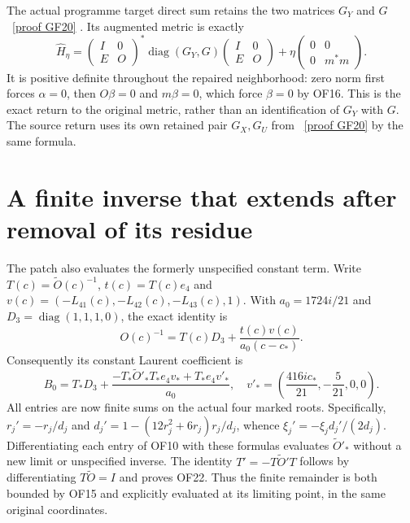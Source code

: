\documentclass[11pt]{article}
\newcommand{\diag}{\operatorname{diag}}
\begin{document}
The actual programme target direct sum retains the two matrices
$G_Y$ and $G$ \cite[RW14]{Fable}%
~\href{https://github.com/KokunoYumeto/zeta-function-research-reader/blob/5992ad50c0f2a06921f1fcaded7b4e38097c0739/workbenches/splitzero-tandem/continuations/20260920-original-kernel-mixed-determinants/providers/FABLE_TO_ORIGINAL_CONDUCTOR.tex\#L1598}{[proof GF20]}%
{}. Its augmented metric is exactly
\begin{equation}
 \widehat H_\eta=
 \begin{pmatrix}I&0\\E&O\end{pmatrix}^{\!*}
 \diag(G_Y,G)
 \begin{pmatrix}I&0\\E&O\end{pmatrix}
 +\eta\begin{pmatrix}0&0\\0&m^*m\end{pmatrix}.
 \tag{OF20}
\end{equation}
It is positive definite throughout the repaired neighborhood:
zero norm first forces $\alpha=0$, then $O\beta=0$ and
$m\beta=0$, which force $\beta=0$ by OF16. This is the exact
return to the original metric, rather than an identification of
$G_Y$ with $G$. The source return uses its own retained pair
$G_X,G_U$ from \cite[RW19]{Fable}%
~\href{https://github.com/KokunoYumeto/zeta-function-research-reader/blob/5992ad50c0f2a06921f1fcaded7b4e38097c0739/workbenches/splitzero-tandem/continuations/20260920-original-kernel-mixed-determinants/providers/FABLE_TO_ORIGINAL_CONDUCTOR.tex\#L1598}{[proof GF20]}%
{} by the same formula.

\section{A finite inverse that extends after removal of its residue}
The patch also evaluates the formerly unspecified constant term.
Write $T(c)=\widetilde O(c)^{-1}$, $t(c)=T(c)e_4$ and
$v(c)=(-L_{41}(c),-L_{42}(c),-L_{43}(c),1)$.
With $a_0=1724i/21$ and $D_3=\diag(1,1,1,0)$, the exact identity is
\begin{equation}
 O(c)^{-1}=T(c)D_3+\frac{t(c)v(c)}{a_0(c-c_*)}.\tag{OF21}
\end{equation}
Consequently its constant Laurent coefficient is
\begin{equation}
 B_0=T_*D_3+
 \frac{-T_*\widetilde O'_*T_*e_4v_*+T_*e_4v'_*}{a_0},
 \quad
 v'_*=\left(\frac{416ic_*}{21},-\frac5{21},0,0\right).
 \tag{OF22}
\end{equation}
All entries are now finite sums on the actual four marked roots.
Specifically, $r_j'=-r_j/d_j$ and
$d_j'=1-(12r_j^2+6r_j)r_j/d_j$, whence
$\xi_j'=-\xi_jd_j'/(2d_j)$. Differentiating each entry of OF10
with these formulas evaluates $\widetilde O'_*$ without a new
limit or unspecified inverse. The identity $T'=-T\widetilde O'T$
follows by differentiating $T\widetilde O=I$ and proves OF22.
Thus the finite remainder is both bounded by OF15 and explicitly
evaluated at its limiting point, in the same original coordinates.
\end{document}
